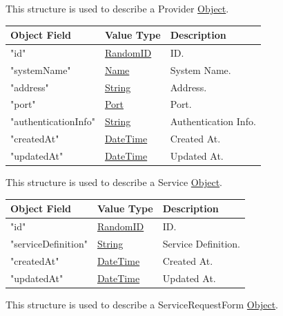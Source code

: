 \documentclass[a4paper]{arrowhead}
\newcommand{\pref}[1]{{\textcolor{ArrowheadGrey}{\hyperref[sec:model:primitives:#1]{#1}}}}
\begin{document}

This structure is used to describe a Provider \pref{Object}. 

\begin{table}[ht!]
\begin{tabularx}{\textwidth}{| p{6cm} | p{5cm} | X |} \hline
\rowcolor{gray!33} Object Field & Value Type      & Description \\ \hline
"id"                 & \pref{RandomID} & ID. \\ \hline
"systemName"         & \pref{Name}     & System Name. \\ \hline
"address"            & \pref{String}   & Address. \\ \hline
"port"               & \pref{Port}     & Port. \\ \hline
"authenticationInfo" & \pref{String}   & Authentication Info. \\ \hline
"createdAt"          & \pref{DateTime} & Created At. \\ \hline
"updatedAt"          & \pref{DateTime} & Updated At. \\ \hline

\end{tabularx}
\end{table}


This structure is used to describe a Service \pref{Object}. 

\begin{table}[ht!]
\begin{tabularx}{\textwidth}{| p{5cm} | p{6cm} | X |} \hline
\rowcolor{gray!33} Object Field & Value Type      & Description \\ \hline
"id"                 & \pref{RandomID} & ID. \\ \hline
"serviceDefinition"  & \pref{String}   & Service Definition. \\ \hline
"createdAt"          & \pref{DateTime} & Created At. \\ \hline
"updatedAt"          & \pref{DateTime} & Updated At. \\ \hline

\end{tabularx}
\end{table}


This structure is used to describe a ServiceRequestForm \pref{Object}. 
\end{document}
